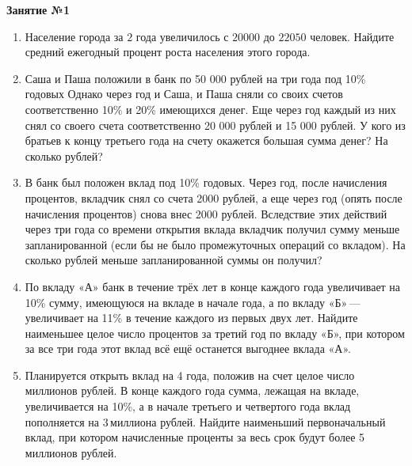 \documentclass[12pt, a4paper]{article}
\begin{document}
	
   \cfoot{}
\begin{center}
	\Large
	\textbf{Занятие №1}
\end{center}
\begin{enumerate}[label=\textbf{\arabic*.}]
	\item Население города за \( 2 \) года увеличилось с \( 20 000 \) до \( 22 050 \) человек. Найдите средний ежегодный процент роста населения этого города.
	\item Саша и Паша положили в банк по 50 000 рублей на три года под 10\% годовых Однако через год и Саша, и Паша сняли со своих счетов соответственно 10\% и 20\% имеющихся денег. Еще через год каждый из них снял со своего счета соответственно 20 000 рублей и 15 000 рублей. У кого из братьев к концу третьего года на счету окажется большая сумма денег? На сколько рублей?
	\item В банк был положен вклад под 10\% годовых. Через год, после начисления процентов, вкладчик снял со счета 2000 рублей, а еще через год (опять после начисления процентов) снова внес 2000 рублей. Вследствие этих действий через три года со времени открытия вклада вкладчик получил сумму меньше запланированной (если бы не было промежуточных операций со вкладом). На сколько рублей меньше запланированной суммы он получил?
	\item По вкладу «А» банк в течение трёх лет в конце каждого года увеличивает на 10\% сумму, имеющуюся на вкладе в начале года, а по вкладу «Б» — увеличивает на 11\% в течение каждого из первых двух лет. Найдите наименьшее целое число процентов за третий год по вкладу «Б», при котором за все три года этот вклад всё ещё останется выгоднее вклада «А».
	\item Планируется открыть вклад на 4 года, положив на счет целое число миллионов рублей. В конце каждого года сумма, лежащая на вкладе, увеличивается на 10\%, а в начале третьего и четвертого года вклад пополняется на 3 миллиона рублей. Найдите наименьший первоначальный вклад, при котором начисленные проценты за весь срок будут более 5 миллионов рублей.
\end{enumerate}
\end{document}

